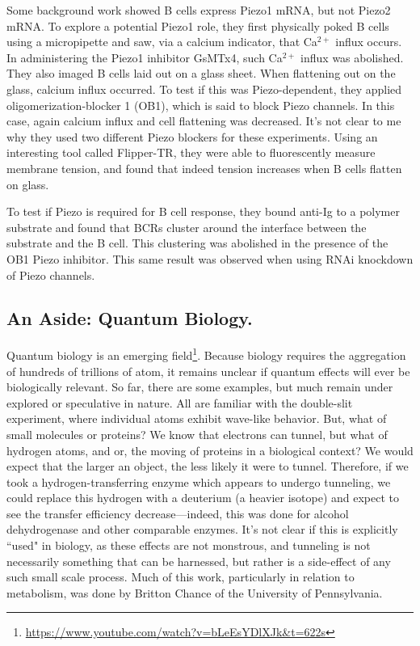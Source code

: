 Some background work showed B cells express Piezo1 mRNA, but not Piezo2 mRNA. To explore a potential Piezo1 role, they first physically poked B cells using a micropipette and saw, via a calcium indicator, that Ca$^{2+}$ influx occurs. In administering the Piezo1 inhibitor GsMTx4, such Ca$^{2+}$ influx was abolished. They also imaged B cells laid out on a glass sheet. When flattening out on the glass, calcium influx occurred. To test if this was Piezo-dependent, they applied oligomerization-blocker 1 (OB1), which is said to block Piezo channels. In this case, again calcium influx and cell flattening was decreased. It's not clear to me why they used two different Piezo blockers for these experiments. Using an interesting tool called Flipper-TR, they were able to fluorescently measure membrane tension, and found that indeed tension increases when B cells flatten on glass.\newline

To test if Piezo is required for B cell response, they bound anti-Ig to a polymer substrate and found that BCRs cluster around the interface between the substrate and the B cell. This clustering was abolished in the presence of the OB1 Piezo inhibitor. This same result was observed when using RNAi knockdown of Piezo channels. 

\subsection{An Aside: Quantum Biology.}

    Quantum biology is an emerging field\footnote{\url{https://www.youtube.com/watch?v=bLeEsYDlXJk&t=622s}}. Because biology requires the aggregation of hundreds of trillions of atom, it remains unclear if quantum effects will ever be biologically relevant. So far, there are some examples, but much remain under explored or speculative in nature. All are familiar with the double-slit experiment, where individual atoms exhibit wave-like behavior. But, what of small molecules or proteins? We know that electrons can tunnel, but what of hydrogen atoms, and or, the moving of proteins in a biological context? We would expect that the larger an object, the less likely it were to tunnel. Therefore, if we took a hydrogen-transferring enzyme which appears to undergo tunneling, we could replace this hydrogen with a deuterium (a heavier isotope) and expect to see the transfer efficiency decrease---indeed, this was done for alcohol dehydrogenase and other comparable enzymes. It's not clear if this is explicitly ``used" in biology, as these effects are not monstrous, and tunneling is not necessarily something that can be harnessed, but rather is a side-effect of any such small scale process. Much of this work, particularly in relation to metabolism, was done by Britton Chance of the University of Pennsylvania.\newline

